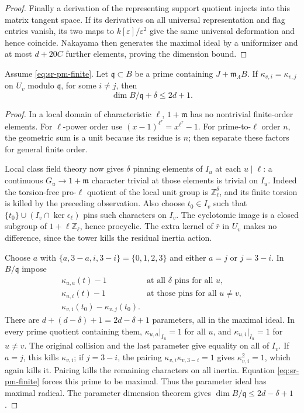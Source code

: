 \begin{proof}
Finally a derivation of the representing support quotient
injects into this matrix tangent space. If its derivatives on
all universal representation and flag entries vanish, its two
maps to \(k[\varepsilon]/\varepsilon^2\) give the same universal
deformation and hence coincide.
Nakayama then generates the maximal ideal by a uniformizer and
at most \(d+20C\) further elements, proving the dimension bound.
\end{proof}

\begin{srlemma}\label{lem:sr-four-collision}
Assume \eqref{eq:sr-pm-finite}.
Let \(\mathfrak q\subset B\) be a prime containing
\(J+\mathfrak m_\Lambda B\). If
\(\kappa_{v,i}=\kappa_{v,j}\) on \(U_v\) modulo \(\mathfrak q\),
for some \(i\ne j\), then
\[
 \dim B/\mathfrak q+\delta\le2d+1.
\]
\end{srlemma}
\begin{proof}
In a local domain of characteristic \(\ell\),
\(1+\mathfrak m\) has no nontrivial finite-order elements.
For \(\ell\)-power order use
\((x-1)^{\ell^r}=x^{\ell^r}-1\).
For prime-to-\(\ell\) order \(n\), the geometric sum is a
unit because its residue is \(n\); then separate these factors
for general finite order.

Local class field theory now gives \(\delta\) pinning elements
of \(I_u\) at each \(u\mid\ell\): a continuous
\(G_u\to1+\mathfrak m\) character trivial at those elements is
trivial on \(I_u\).
Indeed the torsion-free pro-\(\ell\) quotient of the local unit
group is \(\mathbb Z_\ell^\delta\), and its finite torsion is
killed by the preceding observation.
Also choose \(t_0\in I_v\) such that
\(\{t_0\}\cup(I_v\cap\ker\epsilon_\ell)\) pins such characters
on \(I_v\).
The cyclotomic image is a closed subgroup of
\(1+\ell\mathbb Z_\ell\), hence procyclic.
The extra kernel of \(\bar r\) in \(U_v\) makes no difference,
since the tower kills the residual inertia action.

Choose \(a\) with \(\{a,3-a,i,3-i\}=\{0,1,2,3\}\) and either
\(a=j\) or \(j=3-i\). In \(B/\mathfrak q\) impose
\[
 \begin{array}{ll}
 \kappa_{u,a}(t)-1&
    \text{at all \(\delta\) pins for all \(u\)},\\
 \kappa_{u,i}(t)-1&
    \text{at those pins for all \(u\ne v\)},\\
 \kappa_{v,i}(t_0)-\kappa_{v,j}(t_0).&
 \end{array}
\]
There are \(d+(d-\delta)+1=2d-\delta+1\) parameters,
all in the maximal ideal.
In every prime quotient containing them,
\(\kappa_{u,a}|_{I_u}=1\) for all \(u\), and
\(\kappa_{u,i}|_{I_u}=1\) for \(u\ne v\).
The original collision and the last parameter give equality on
all of \(I_v\).
If \(a=j\), this kills \(\kappa_{v,i}\);
if \(j=3-i\), the pairing
\(\kappa_{v,i}\kappa_{v,3-i}=1\) gives
\(\kappa_{v,i}^2=1\), which again kills it.
Pairing kills the remaining characters on all inertia.
Equation \eqref{eq:sr-pm-finite} forces this prime to be maximal.
Thus the parameter ideal has maximal radical.
The parameter dimension theorem gives
\(\dim B/\mathfrak q\le2d-\delta+1\).
\end{proof}


